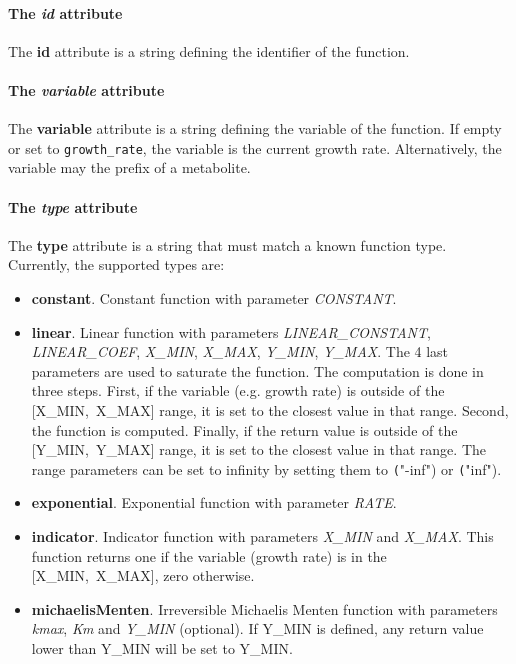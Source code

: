 \paragraph{The \textit{id} attribute}
The \textbf{id} attribute is a string defining the identifier of the function.

\paragraph{The \textit{variable} attribute}
The \textbf{variable} attribute is a string defining the variable of the function.
If empty or set to \texttt{growth\_rate}, the variable is the current growth rate.
Alternatively, the variable may the prefix of a metabolite.

\paragraph{The \textit{type} attribute}
The \textbf{type} attribute is a string that must match a known function type.
Currently, the supported types are:
\begin{itemize}
  \item \textbf{constant}.
  Constant function with parameter
  \textit{CONSTANT}.
  \item \textbf{linear}.
  Linear function with parameters
  \textit{LINEAR\_CONSTANT}, \textit{LINEAR\_COEF},
  \textit{X\_MIN}, \textit{X\_MAX}, \textit{Y\_MIN}, \textit{Y\_MAX}.
  The 4 last parameters are used to saturate the function.
  The computation is done in three steps.
  First, if the variable (e.g. growth rate) is outside of the [X\_MIN,~X\_MAX] range,
  it is set to the closest value in that range.
  Second, the function is computed.
  Finally, if the return value is outside of the [Y\_MIN,~Y\_MAX] range,
  it is set to the closest value in that range.
  The range parameters can be set to infinity by setting them to
  \texttt("-inf") or \texttt("inf").
  \item \textbf{exponential}.
  Exponential function with parameter \textit{RATE}.
  \item \textbf{indicator}.
  Indicator function with parameters
  \textit{X\_MIN} and \textit{X\_MAX}.
  This function returns one if the variable (growth rate) is in the
  [X\_MIN,~X\_MAX], zero otherwise.
  \item \textbf{michaelisMenten}.
  Irreversible Michaelis Menten function with parameters
  \textit{kmax}, \textit{Km} and \textit{Y\_MIN} (optional).
  If Y\_MIN is defined, any return value lower than Y\_MIN will be set to
  Y\_MIN.\@
\end{itemize}


